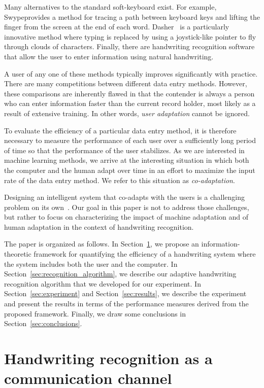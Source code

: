 \documentclass{sigchi}
\begin{document}
Many alternatives to the standard soft-keyboard exist. For example,
Swype\tm provides a method for tracing a path between keyboard keys
and lifting the finger from the screen at the end of each
word. Dasher~\cite{Garrett2003} is a particularly innovative method
where typing is replaced by using a joystick-like pointer to fly
through clouds of characters. Finally, there are handwriting
recognition software that allow the user to enter information using
natural handwriting.

A user of any one of these methods typically improves significantly
with practice. There are many competitions between different data
entry methods. However, these comparisons are inherently flawed in
that the contender is always a person who can enter information faster
than the current record holder, most likely as a result of extensive
training. In other words, {\em user adaptation} cannot be ignored.

To evaluate the efficiency of a particular data entry method, it is
therefore necessary to measure the performance of each user over a
sufficiently long period of time so that the performance of the user
stabilizes. As we are interested in machine learning methods, we arrive
at the interesting situation in which both the computer and the human
adapt over time in an effort to maximize the input rate of the
data entry method. We refer to this situation as {\em co-adaptation}.

Designing an intelligent system that co-adapts with the users is a
challenging problem on its own~\cite{Hook2000, Maes1994, Lim2009a}.
Our goal in this paper is not to address those challenges, but rather
to focus on characterizing the impact of machine adaptation and of
human adaptation in the context of handwriting recognition.
 
The paper is organized as follows. In Section~\ref{sec:channel}, we
propose an information-theoretic framework for quantifying the
efficiency of a handwriting system where the system includes both the
user and the computer. In Section~\ref{sec:recognition_algorithm}, we
describe our adaptive handwriting recognition algorithm that we
developed for our experiment. In Section~\ref{sec:experiment} and
Section~\ref{sec:results}, we describe the experiment and present the
results in terms of the performance measures derived from the proposed
framework. Finally, we draw some conclusions in
Section~\ref{sec:conclusions}.


\section{Handwriting recognition as a communication channel}
\label{sec:channel}
\end{document}
